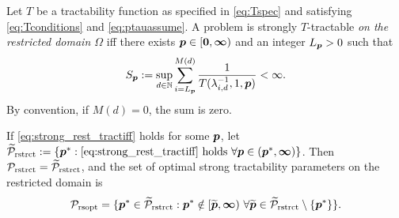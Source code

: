 \documentclass[11pt,a4paper]{article}
\begin{document}
\begin{theorem}\label{thm_main_rest_strong_tract}
Let $T$ be a tractability function as specified in \eqref{eq:Tspec} and satisfying \eqref{eq:Tconditions} and \eqref{eq:ptauassume}.  A problem is strongly $T$-tractable \emph{on the restricted domain $\Omega$} iff there exists $\boldsymbol{p} \in [\boldsymbol{0}, \boldsymbol{\infty})$ and an integer $L_{\boldsymbol{p}} > 0$ such that
\begin{equation} \label{eq:strong_rest_tractiff}
     S_{\boldsymbol{p}}:=\sup_{d \in \mathbb{N}} \sum_{i = L_{\boldsymbol{p}}}^{M(d)} \frac{1}{T(\lambda_{i,d}^{-1},1,\boldsymbol{p})} < \infty.
\end{equation}
By convention, if $M(d) = 0$, the sum is zero.

If \eqref{eq:strong_rest_tractiff} holds for some $\boldsymbol{p}$, let  $\widetilde{\mathcal{P}}_{\textup{rstrct}} : = \{\boldsymbol{p}^* : \eqref{eq:strong_rest_tractiff} \text{ holds }\forall \boldsymbol{p} \in (\boldsymbol{p}^*,\boldsymbol{\infty})\}$.  Then $\mathcal{P}_{\textup{rstrct}} = \widetilde{\mathcal{P}}_{\textup{rstrct}}$, and the set of optimal strong tractability parameters on the restricted domain is
\[
	\mathcal{P}_{\textup{rsopt}} =
	\{\boldsymbol{p}^* \in \widetilde{\mathcal{P}}_{\textup{rstrct}} :  \boldsymbol{p}^* \notin [\widetilde{\boldsymbol{p}},\boldsymbol{\infty}) \ \forall \widetilde{\boldsymbol{p}}\in  \widetilde{\mathcal{P}}_{\textup{rstrct}} \setminus \{\boldsymbol{p}^*\} \}.
\]
\end{theorem}
\end{document}

